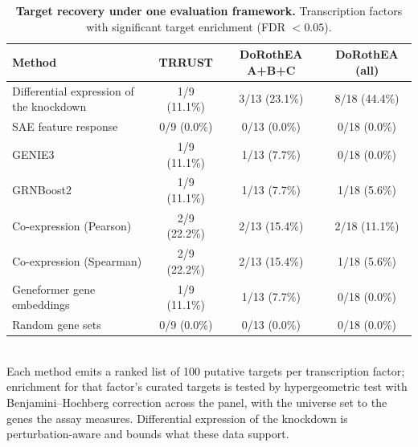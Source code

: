 \begin{table}[htbp]
\centering
\caption{\textbf{Target recovery under one evaluation framework.} Transcription factors with significant target enrichment (FDR $< 0.05$).}
\label{tab:ceiling}
\smallskip
\small
\begin{tabular}{lccc}
\toprule
Method & TRRUST & DoRothEA A+B+C & DoRothEA (all) \\
\midrule
Differential expression of the knockdown & 1/9 (11.1\%) & 3/13 (23.1\%) & 8/18 (44.4\%) \\
SAE feature response & 0/9 (0.0\%) & 0/13 (0.0\%) & 0/18 (0.0\%) \\
GENIE3 & 1/9 (11.1\%) & 1/13 (7.7\%) & 0/18 (0.0\%) \\
GRNBoost2 & 1/9 (11.1\%) & 1/13 (7.7\%) & 1/18 (5.6\%) \\
Co-expression (Pearson) & 2/9 (22.2\%) & 2/13 (15.4\%) & 2/18 (11.1\%) \\
Co-expression (Spearman) & 2/9 (22.2\%) & 2/13 (15.4\%) & 1/18 (5.6\%) \\
Geneformer gene embeddings & 1/9 (11.1\%) & 1/13 (7.7\%) & 0/18 (0.0\%) \\
Random gene sets & 0/9 (0.0\%) & 0/13 (0.0\%) & 0/18 (0.0\%) \\
\bottomrule
\end{tabular}
\\[2pt]
\footnotesize Each method emits a ranked list of 100 putative targets per transcription factor; enrichment for that factor's curated targets is tested by hypergeometric test with Benjamini--Hochberg correction across the panel, with the universe set to the genes the assay measures. Differential expression of the knockdown is perturbation-aware and bounds what these data support.
\end{table}
